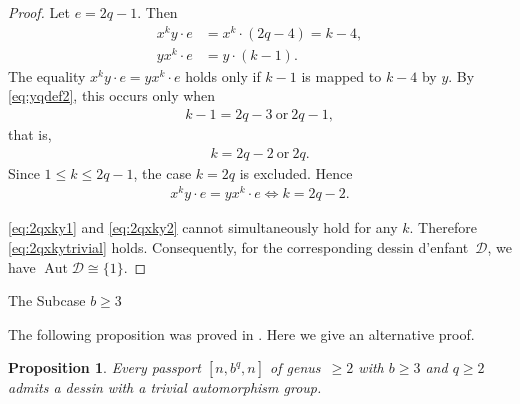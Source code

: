 \documentclass[12pt,reqno]{amsart}
\makeatletter
\newif\if@noindentafterheading
\renewcommand\subsection{\@startsection{subsection}{2}{\z@}%
  {-2.5ex \@plus -.3ex \@minus -.2ex}%
  {1.5ex \@plus .2ex}%
  {\normalfont\bfseries}%
}
\let\orig@subsection\subsection
\renewcommand\subsection{%
  \@ifstar{\subsection@star}{\subsection@nostar}%
}
\newcommand\subsection@nostar{%
  \@ifnextchar[{\subsection@opt}{\subsection@noopt}%
}
\newcommand\subsection@opt[2][]{%
  \global\@noindentafterheadingtrue
  \orig@subsection[#1]{#2}%
  \global\@noindentafterheadingfalse
}
\newcommand\subsection@noopt[1]{%
  \global\@noindentafterheadingtrue
  \orig@subsection{#1}%
  \global\@noindentafterheadingfalse
}
\newcommand\subsection@star[1]{%
  \global\@noindentafterheadingtrue
  \orig@subsection*{#1}%
  \global\@noindentafterheadingfalse
}
\newcommand{\msD}{\mathscr{D}}
\DeclareMathOperator{\Aut}{Aut}							%
\theoremstyle{mythmstyle}
\newtheorem{prop}[lemma]{Proposition}
\theoremstyle{mydefstyle}
\newcommand{\dde}{dessin d'enfant\xspace}
\newcommand{\AD}{\Aut{\msD}}
\numberwithin{equation}{section}
\makeatother
\begin{document}
\begin{proof}
\item[(ii)] Let $e = 2q-1$. Then
\begin{align}
x^{k}y\cdot e &= x^{k} \cdot (2q-4) = k-4, \\
yx^{k}\cdot e &= y\cdot(k-1).
\end{align}
The equality $x^{k}y\cdot e = yx^{k}\cdot e$ holds only if
$k-1$ is mapped to $k-4$ by $y$. By \eqref{eq:yqdef2}, this occurs only when
\begin{align}
k - 1 = 2q-3\ \text{or}\ 2q-1,
\end{align}
that is,
\begin{align}
k = 2q-2\ \text{or}\ 2q.
\end{align}
Since $1 \le k \le 2q-1$, the case $k = 2q$ is excluded. Hence
\begin{align}
\label{eq:2qxky2}
x^{k}y\cdot e = yx^{k}\cdot e \iff k =2q-2.
\end{align}

\eqref{eq:2qxky1} and \eqref{eq:2qxky2} cannot simultaneously hold for any $k$.
Therefore \eqref{eq:2qxkytrivial} holds.
Consequently, for the corresponding \dde\ $\msD$, we have
$\AD \cong \{ 1 \}$.
\end{proof}

\subsection{The Subcase $b \ge 3$}

The following proposition was proved in \cite[Proposition~7.5]{Ohnishi26}.
Here we give an alternative proof.

\begin{prop}
\label{prop:c2bge3}
Every passport $[n, b^{q}, n]$ of genus~$\ge 2$ with $b \ge 3$ and $q \ge 2$ admits a dessin with a trivial automorphism group.
\end{prop}
\end{document}
